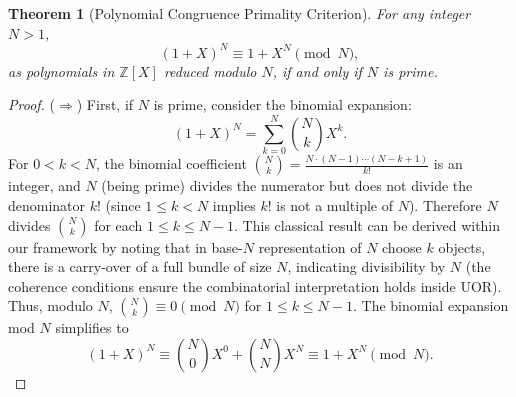 \documentclass[11pt]{article}
\newtheorem{theorem}{Theorem}
\begin{document}
\begin{theorem}[Polynomial Congruence Primality Criterion]\label{thm:poly-criterion}
For any integer $N>1$, 
\[ (1+X)^N \equiv 1 + X^N \pmod{N}, \] 
as polynomials in $\mathbb{Z}[X]$ reduced modulo $N$, if and only if $N$ is prime.
\end{theorem}

\begin{proof}
($\Rightarrow$) First, if $N$ is prime, consider the binomial expansion: 
\[ (1+X)^N = \sum_{k=0}^N \binom{N}{k} X^k. \] 
For $0<k<N$, the binomial coefficient $\binom{N}{k} = \frac{N\cdot (N-1)\cdots (N-k+1)}{k!}$ is an integer, and $N$ (being prime) divides the numerator but does not divide the denominator $k!$ (since $1 \le k < N$ implies $k!$ is not a multiple of $N$). Therefore $N$ divides $\binom{N}{k}$ for each $1 \le k \le N-1$. This classical result can be derived within our framework by noting that in base-$N$ representation of $N$ choose $k$ objects, there is a carry-over of a full bundle of size $N$, indicating divisibility by $N$ (the coherence conditions ensure the combinatorial interpretation holds inside UOR). Thus, modulo $N$, $\binom{N}{k} \equiv 0 \pmod{N}$ for $1 \le k \le N-1$. The binomial expansion mod $N$ simplifies to 
\[ (1+X)^N \equiv \binom{N}{0}X^0 + \binom{N}{N}X^N \equiv 1 + X^N \pmod{N}. \]


\end{proof}
\end{document}
